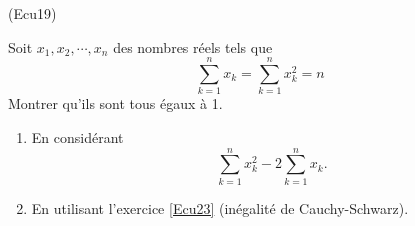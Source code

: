 \begin{tiny}(Ecu19)\end{tiny} Soit $x_1,x_2, \cdots, x_n$ des nombres réels tels que
\begin{displaymath}
 \sum_{k=1}^nx_k = \sum_{k=1}^nx^2_k = n  
\end{displaymath}
Montrer qu'ils sont tous égaux à 1.
\begin{enumerate}
  \item En considérant 
\[
 \sum_{k=1}^nx^2_k - 2\sum_{k=1}^nx_k . 
\]
  \item En utilisant l'exercice \ref{Ecu23} (inégalité de Cauchy-Schwarz).
\end{enumerate}

